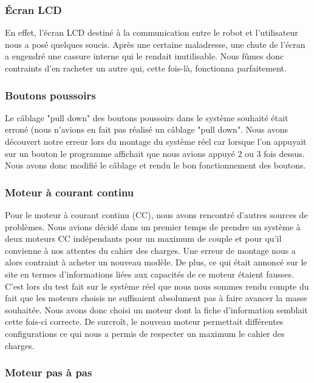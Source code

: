 \documentclass[12pt,a4paper]{article}
\begin{document}
	\subsubsection{Écran LCD}
	
	En effet, l’écran LCD destiné à la communication entre le robot et l’utilisateur nous a posé quelques soucis. Après une certaine maladresse, une chute de l’écran a engendré une cassure interne qui le rendait inutilisable. Nous fûmes donc contraints d’en racheter un autre qui, cette fois-là, fonctionna parfaitement.
	
	\subsubsection{Boutons poussoirs}
	
	Le câblage "pull down" des boutons poussoirs dans le système souhaité était erroné (nous n’avions en fait pas réalisé un câblage "pull down". Nous avons découvert notre erreur lors du montage du système réel car lorsque l’on appuyait sur un bouton le programme affichait que nous avions appuyé 2 ou 3 fois dessus. Nous avons donc modifié le câblage et rendu le bon fonctionnement des boutons.
	
	\subsubsection{Moteur à courant continu}
	
	Pour le moteur à courant continu (CC), nous avons rencontré d’autres sources de problèmes. Nous avions décidé dans un premier temps de prendre un système à deux moteurs CC indépendants pour un maximum de couple et pour qu’il convienne à nos attentes du cahier des charges. Une erreur de montage nous a alors contraint à acheter un nouveau modèle. De plus, ce qui était annoncé sur le site en termes d’informations liées aux capacités de ce moteur étaient fausses. C’est lors du test fait sur le système réel que nous nous sommes rendu compte du fait que les moteurs choisis ne suffisaient absolument pas à faire avancer la masse souhaitée. Nous avons donc choisi un moteur dont la fiche d’information semblait cette fois-ci correcte. De surcroît, le nouveau moteur permettait différentes configurations ce qui nous a permis de respecter un maximum le cahier des charges.
	
	\subsubsection{Moteur pas à pas}
	
\end{document}
